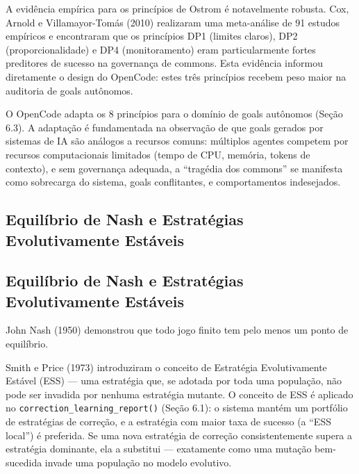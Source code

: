 A evidência empírica para os princípios de Ostrom é notavelmente robusta. Cox, Arnold e Villamayor-Tomás (2010) realizaram uma meta-análise de 91 estudos empíricos e encontraram que os princípios DP1 (limites claros), DP2 (proporcionalidade) e DP4 (monitoramento) eram particularmente fortes preditores de sucesso na governança de commons. Esta evidência informou diretamente o design do OpenCode: estes três princípios recebem peso maior na auditoria de goals autônomos.

O OpenCode adapta os 8 princípios para o domínio de goals autônomos (Seção 6.3). A adaptação é fundamentada na observação de que goals gerados por sistemas de IA são análogos a recursos comuns: múltiplos agentes competem por recursos computacionais limitados (tempo de CPU, memória, tokens de contexto), e sem governança adequada, a ``tragédia dos commons'' se manifesta como sobrecarga do sistema, goals conflitantes, e comportamentos indesejados.

\subsection{Equilíbrio de Nash e Estratégias Evolutivamente Estáveis}

\subsection{Equilíbrio de Nash e Estratégias Evolutivamente Estáveis}

John Nash (1950) demonstrou que todo jogo finito tem pelo menos um ponto de equilíbrio. 

Smith e Price (1973)  introduziram o conceito de Estratégia Evolutivamente Estável (ESS) — uma estratégia que, se adotada por toda uma população, não pode ser invadida por nenhuma estratégia mutante. O conceito de ESS é aplicado no \texttt{correction\_learning\_report()} (Seção 6.1): o sistema mantém um portfólio de estratégias de correção, e a estratégia com maior taxa de sucesso (a ``ESS local'') é preferida. Se uma nova estratégia de correção consistentemente supera a estratégia dominante, ela a substitui — exatamente como uma mutação bem-sucedida invade uma população no modelo evolutivo.

